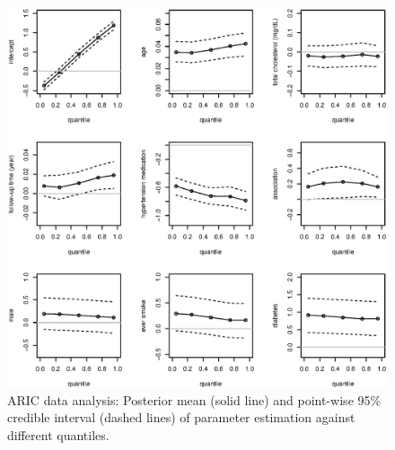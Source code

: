 \restoregeometry
\pagestyle{plain}

\newpage
\begin{figure}[H]
\centering
\includegraphics[width=\textwidth]{0.plots/p2_JM_inference_covs.eps}
\caption{ARIC data analysis: Posterior mean (solid line) and point-wise 95\% credible interval (dashed lines) of parameter estimation against different quantiles.}
\label{p2_jm_infer}
\end{figure}




% 
